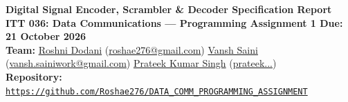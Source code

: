 \documentclass[8.5pt,a4paper]{article}
\begin{document}
\fontsize{8.2pt}{9.8pt}\selectfont

\begin{center}
    {\fontsize{12pt}{14pt}\bfseries\color{navy} Digital Signal Encoder, Scrambler \& Decoder Specification Report}\\[1.5pt]
    {\fontsize{8pt}{9.5pt}\bfseries\color{subgray} ITT 036: Data Communications --- Programming Assignment 1 \quad\textbar\quad Due: 21 October 2026}\\[2pt]
    {\fontsize{7.8pt}{9.2pt}
    \textbf{Team:} 
    \href{https://github.com/Roshae276}{Roshni Dodani} (\href{mailto:roshae276@gmail.com}{roshae276@gmail.com}) \quad\textbar\quad
    \href{https://github.com/vanshsaini48}{Vansh Saini} (\href{mailto:vansh.sainiwork@gmail.com}{vansh.sainiwork@gmail.com}) \quad\textbar\quad
    \href{https://github.com/prateekumarsingh9939-beep}{Prateek Kumar Singh} (\href{mailto:prateekumarsingh9939@gmail.com}{prateek...})
    }\\[1.5pt]
    {\fontsize{7.8pt}{9.2pt}\textbf{Repository:} \href{https://github.com/Roshae276/DATA_COMM_PROGRAMMING_ASSIGNMENT}{\texttt{https://github.com/Roshae276/DATA\_COMM\_PROGRAMMING\_ASSIGNMENT}}}
\end{center}
\vspace{-8pt}
\end{document}
